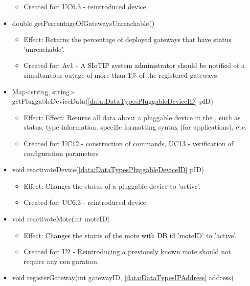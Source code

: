 \begin{description}
\begin{itemize}[noitemsep,nolistsep,leftmargin=-.25cm]
\begin{itemize}[noitemsep,nolistsep]
\item Created for: UC6.3 - reintroduced device
        \end{itemize}
      \item \textsf{double getPercentageOfGatewaysUnreachable()}
        \begin{itemize}[noitemsep,nolistsep]
           \item Effect: Returns the percentage of deployed gateways that have status 'unreachable'.
\item Created for: Av1 - A SIoTIP system administrator should be notified of a simultaneous outage of more than 1\% of the registered gateways.
        \end{itemize}
      \item \textsf{Map\textless{}string, string\textgreater{} getPluggableDeviceData(\ref{data:DataTypesPluggableDeviceID} pID)}
        \begin{itemize}[noitemsep,nolistsep]
           \item Effect: Effect: Returns all data about a pluggable device in the , such as status, type information, specific formatting syntax (for applications), etc.
\item Created for: UC12 - construction of commands, UC13 - verification of configuration parameters
        \end{itemize}
      \item \textsf{void reactivateDevice(\ref{data:DataTypesPluggableDeviceID} pID)}
        \begin{itemize}[noitemsep,nolistsep]
           \item Effect: Changes the status of a pluggable device to 'active'.
\item Created for: UC6.3 - reintroduced device
        \end{itemize}
      \item \textsf{void reactivateMote(int moteID)}
        \begin{itemize}[noitemsep,nolistsep]
           \item Effect: Changes the status of the mote with DB id 'moteID' to 'active'.
\item Created for: U2 - Reintroducing a previously known mote should not require any conguration.
        \end{itemize}
      \item \textsf{void registerGateway(int gatewayID, \ref{data:DataTypesIPAddress} address)}
        \begin{itemize}

\end{itemize}
\end{itemize}
\end{description}
